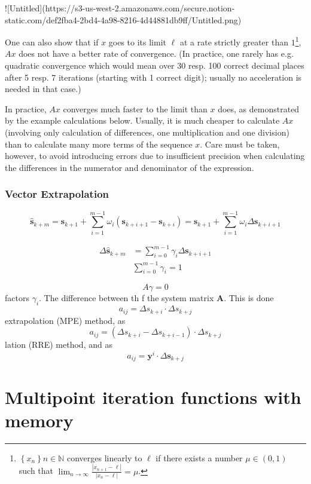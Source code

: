 ![Untitled](https://s3-us-west-2.amazonaws.com/secure.notion-static.com/def2fba4-2bd4-4a98-8216-4d44881db9ff/Untitled.png)

One can also show that if \(x\) goes to its limit \(\ell\) at a rate strictly greater than \(1\)\footnote{$\left\{x_{n}\right\}{n \in \mathbb{N}}$ converges linearly to $\ell$ if there exists a number $\mu \in(0,1)$ such that \(\lim_{n \rightarrow \infty} \frac{\left|x_{n+1}-\ell\right|}{\left|x_{n}-\ell\right|}=\mu\).}, \(A x\) does not have a better rate of convergence.
(In practice, one rarely has e.g. quadratic convergence which would mean over 30 resp. 100 correct decimal places after 5 resp. 7 iterations (starting with 1 correct digit); usually no acceleration is needed in that case.)

In practice, \(A x\) converges much faster to the limit than \(x\) does, as demonstrated by the example calculations below. Usually, it is much cheaper to calculate \(A x\) (involving only calculation of differences, one multiplication and one division) than to calculate many more terms of the sequence \(x\). Care must be taken, however, to avoid introducing errors due to insufficient precision when calculating the differences in the numerator and denominator of the expression.


\subsubsection{Vector Extrapolation}

$$
\hat{\boldsymbol{s}}_{k+m}=\boldsymbol{s}_{k+1}+\sum_{i=1}^{m-1} \omega_{i}\left(\boldsymbol{s}_{k+i+1}-\boldsymbol{s}_{k+i}\right)=\boldsymbol{s}_{k+1}+\sum_{i=1}^{m-1} \omega_{i} \Delta \boldsymbol{s}_{k+i+1}
$$

$$
\begin{aligned}\Delta \hat{\boldsymbol{s}}_{k+m} &=\sum_{i=0}^{m-1} \gamma_{i} \Delta \boldsymbol{s}_{k+i+1} \\& \sum_{i=0}^{m-1} \gamma_{i}=1\end{aligned}
$$

\[
A \gamma=0
\]
factors \(\gamma_{i}\). The difference between th f the system matrix \(\boldsymbol{A}\). This is done
\[
a_{i j}=\Delta s_{k+i} \cdot \Delta s_{k+j}
\]
extrapolation (MPE) method, as
\[
a_{i j}=\left(\Delta s_{k+i}-\Delta s_{k+i-1}\right) \cdot \Delta s_{k+j}
\]
lation (RRE) method, and as
\[
a_{i j}=\boldsymbol{y}^{i} \cdot \Delta \boldsymbol{s}_{k+j}
\]



\section{Multipoint iteration functions with memory}
